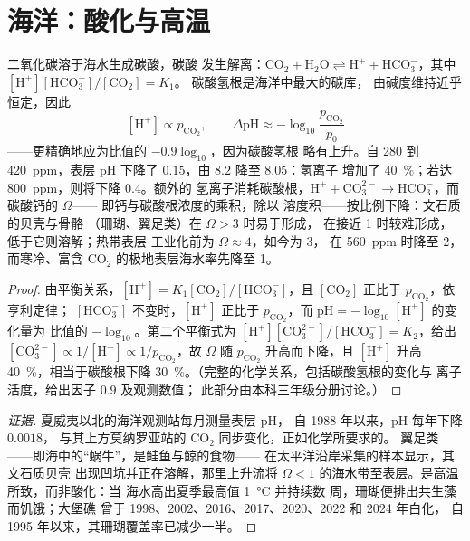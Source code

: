 \section{海洋：酸化与高温}

\begin{theorem}[酸化]\label{thm:b2:global-change:acid}
二氧化碳溶于海水生成碳酸，碳酸
发生解离：$\ensuremath{\mathrm{CO_2}} + \ensuremath{\mathrm{H_2O}} \rightleftharpoons \ensuremath{\mathrm{H^{+}}} +
\ensuremath{\mathrm{HCO_3^{-}}}$，其中 $[\ensuremath{\mathrm{H^{+}}}][\ensuremath{\mathrm{HCO_3^{-}}}]/[\ensuremath{\mathrm{CO_2}}] = K_1$。
碳酸氢根是海洋中最大的碳库，
由碱度维持近乎恒定，因此
\[
[\ensuremath{\mathrm{H^{+}}}] \propto p_{\ensuremath{\mathrm{CO_2}}}, \qquad
\Delta\mathrm{pH} \approx -\log_{10}\frac{p_{\ensuremath{\mathrm{CO_2}}}}{p_0}
\]
——更精确地应为比值的 $-0.9\log_{10}$，因为碳酸氢根
略有上升。自 280 到 \qty{420}{ppm}，表层 pH 下降了
$0.15$，由 $8.2$ 降至 $8.05$：氢离子
增加了 \qty{40}{\%}；若达 \qty{800}{ppm}，则将下降 $0.4$。额外的
氢离子消耗碳酸根，$\ensuremath{\mathrm{H^{+}}} + \ensuremath{\mathrm{CO_3^{2-}}} \to \ensuremath{\mathrm{HCO_3^{-}}}$，而
碳酸钙的\emph{} $\Omega$——
即钙与碳酸根浓度的乘积，除以
溶度积——按比例下降：文石质的贝壳与骨骼
（珊瑚、翼足类）在 $\Omega > 3$ 时易于形成，
在接近 1 时较难形成，低于它则溶解；热带表层
工业化前为 $\Omega \approx 4$，如今为 3，
在 \qty{560}{ppm} 时降至 2，而寒冷、富含
\ensuremath{\mathrm{CO_2}} 的极地表层海水率先降至 1。
\end{theorem}
\begin{proof}
由平衡关系，$[\ensuremath{\mathrm{H^{+}}}] = K_1[\ensuremath{\mathrm{CO_2}}]/[\ensuremath{\mathrm{HCO_3^{-}}}]$，且
$[\ensuremath{\mathrm{CO_2}}]$ 正比于 $p_{\ensuremath{\mathrm{CO_2}}}$，依亨利定律；
$[\ensuremath{\mathrm{HCO_3^{-}}}]$ 不变时，$[\ensuremath{\mathrm{H^{+}}}]$ 正比于
$p_{\ensuremath{\mathrm{CO_2}}}$，而 $\mathrm{pH} = -\log_{10}[\ensuremath{\mathrm{H^{+}}}]$ 的变化量为
比值的 $-\log_{10}$。第二个平衡式为 $[\ensuremath{\mathrm{H^{+}}}][\ensuremath{\mathrm{CO_3^{2-}}}]/[\ensuremath{\mathrm{HCO_3^{-}}}]
= K_2$，给出 $[\ensuremath{\mathrm{CO_3^{2-}}}] \propto 1/[\ensuremath{\mathrm{H^{+}}}] \propto
1/p_{\ensuremath{\mathrm{CO_2}}}$，故 $\Omega$ 随 $p_{\ensuremath{\mathrm{CO_2}}}$ 升高而下降，且
$[\ensuremath{\mathrm{H^{+}}}]$ 升高 \qty{40}{\%}，相当于碳酸根下降
\qty{30}{\%}。（完整的化学关系，包括碳酸氢根的变化与
离子活度，给出因子 $0.9$ 及观测数值；
此部分由本科三年级分册讨论。）
\end{proof}
\begin{proof}[证据]
夏威夷以北的海洋观测站每月测量表层 pH，
自 1988 年以来，pH 每年下降 $0.0018$，
与其上方莫纳罗亚站的 \ensuremath{\mathrm{CO_2}} 同步变化，正如化学所要求的。
翼足类——即海中的“蜗牛”，是鲑鱼与鲸的食物——
在太平洋沿岸采集的样本显示，其文石质贝壳
出现凹坑并正在溶解，那里上升流将 $\Omega <
1$ 的海水带至表层。是高温所致，而非酸化：当
海水高出夏季最高值 \qty{1}{\celsius} 并持续数
周，珊瑚便排出共生藻而饥饿；大堡礁
曾于 1998、2002、2016、2017、2020、2022 和 2024 年白化，
自 1995 年以来，其珊瑚覆盖率已减少一半。
\end{proof}


